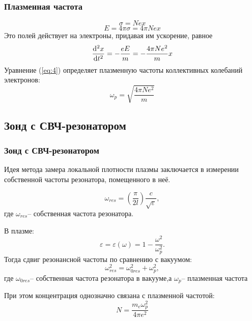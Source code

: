 \documentclass[10pt,pdf,hyperref={unicode}, dvipsnames]{beamer}
\begin{document}
\begin{frame}[t]\frametitle{Плазменная частота}
\begin{equation}
	\sigma = Nex
\end{equation}
\begin{equation}
	E=4\pi\sigma=4\pi Nex
\end{equation}
Это полей действует на электроны, придавая им ускорение, равное
\begin{equation}
	\label{eq:4}
	\dv[2]{x}{t}=-\frac{eE}{m}=-\frac{4\pi N e^2}{m}x
\end{equation}
Уравнение (\ref{eq:4}) определяет плазменную частоты коллективных колебаний электронов:
\begin{equation}
	\omega_p=\sqrt{\frac{4\pi N e^2}{m}}
\end{equation}



\end{frame}


\subsection{Зонд с СВЧ-резонатором} %

\begin{frame}
	\frametitle{Зонд с СВЧ-резонатором}
	Идея метода замера локальной  плотности плазмы заключается в измерении собственной частоты резонатора, помещенного в неё.

	\begin{equation}
		\omega_{res}=\left(\frac\pi{2l}\right)\frac c{\sqrt{\varepsilon}},
	\end{equation}
	где $\omega_{res}$-- собственная частота резонатора.

	В плазме: $$\varepsilon=\varepsilon(\omega)=1-\frac{\omega^2}{\omega_p^2}.$$ 
	Тогда сдвиг резонансной частоты по сравнению с вакуумом:
	$$\omega_{res}^2=\omega_{0res}^2+\omega_p^2,$$ 
	где $\omega_{0res}$-- собственная частота резонатора в вакууме,а $\omega_p$-- плазменная частота

	При этом концентрация однозначно связана с плазменной частотой:
	\begin{equation}
		N=\frac{m_e\omega^2_p}{4\pi e^2}
	\end{equation}
\end{frame}
\end{document}
